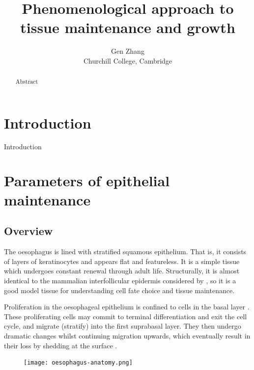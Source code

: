 \documentclass[10pt,english]{report}
\begin{document}
\author{Gen Zhang\\
	Churchill College, Cambridge}
\title{Phenomenological approach to tissue maintenance and growth}

\maketitle



\begin{abstract}
Abstract
\end{abstract}

\tableofcontents

\chapter{Introduction}
\setcounter{page}{1}

Introduction \citet{clayton}

\chapter{Parameters of epithelial maintenance}

\section{Overview}

The oesophagus is lined with stratified squamous epithelium. That is, it consists of layers of keratinocytes and appears flat and featureless. It is a simple tissue which undergoes constant renewal through adult life. Structurally, it is almost identical to the mammalian interfollicular epidermis considered by \citet{clayton}, so it is a good model tissue for understanding cell fate choice and tissue maintenance.

Proliferation in the oesophageal epithelium is confined to cells in the basal layer \citep{leblond}. These proliferating cells may commit to terminal differentiation and exit the cell cycle, and migrate (stratify) into the first suprabasal layer. They then undergo dramatic changes whilst continuing migration upwards, which eventually result in their loss by shedding at the surface \citep{seery}.

\begin{figure}[h]
	\centering
	\texttt{[image: oesophagus-anatomy.png]}
\end{figure}
\end{document}
